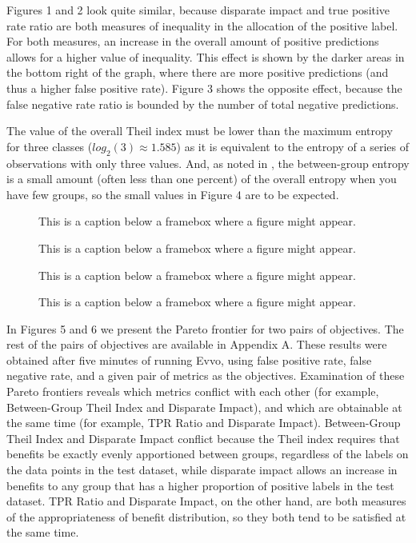 \documentclass[twoside]{article}
\begin{document}
Figures 1 and 2 look quite similar, because disparate impact and true positive rate ratio are both measures of inequality in the allocation of the positive label. For both measures, an increase in the overall amount of positive predictions allows for a higher value of inequality. This effect is shown by the darker areas in the bottom right of the graph, where there are more positive predictions (and thus a higher false positive rate). Figure 3 shows the opposite effect, because the false negative rate ratio is bounded by the number of total negative predictions.

The value of the overall Theil index must be lower than the maximum entropy for three classes ($log_2(3) \approx 1.585$) as it is equivalent to the entropy of a series of observations with only three values. And, as noted in \citep{Speicher:2018}, the between-group entropy is a small amount (often less than one percent) of the overall entropy when you have few groups, so the small values in Figure 4 are to be expected.


\newcommand{\fig}[2]{
	\begin{figure}[t]{
		\centering{
			\texttt{[image: \#1]}
		}
		\caption{#2}
	}
	\end{figure}
}

\newcommand{\figures}[4]{
	\begin{figure}[H]{
		\centering{
			\texttt{[image: \#1]}
		}
		\caption{#2}
		\centering{
			\texttt{[image: \#3]}
		}
		\caption{#4}
		
	}
	\end{figure}
}

\figures{FNR Ratio|COMPAS.png}{This is a caption below a framebox where a figure might appear.}{TPR Ratio|COMPAS.png}{This is a caption below a framebox where a figure might appear.}

\fig{Disparate Impact|COMPAS.png}{This is a caption below a framebox where a figure might appear.}

\fig{Between-Group Theil Index|COMPAS.png}{This is a caption below a framebox where a figure might appear.}

In Figures 5 and 6 we present the Pareto frontier for two pairs of objectives. The rest of the pairs of objectives are available in Appendix A. These results were obtained after five minutes of running Evvo, using false positive rate, false negative rate, and a given pair of metrics as the objectives. Examination of these Pareto frontiers reveals which metrics conflict with each other (for example, Between-Group Theil Index and Disparate Impact), and which are obtainable at the same time (for example, TPR Ratio and Disparate Impact). Between-Group Theil Index and Disparate Impact conflict because the Theil index requires that benefits be exactly evenly apportioned between groups, regardless of the labels on the data points in the test dataset, while disparate impact allows an increase in benefits to any group that has a higher proportion of positive labels in the test dataset. TPR Ratio and Disparate Impact, on the other hand, are both measures of the appropriateness of benefit distribution, so they both tend to be satisfied at the same time. 
\end{document}
